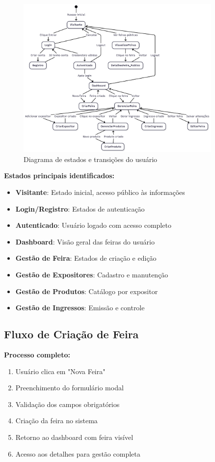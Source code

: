 \documentclass[12pt,a4paper]{article}
\begin{document}
\begin{figure}[H]
\centering
\includegraphics[width=0.9\textwidth]{diagrams/diagrama_estados_usuario.png}
\caption{Diagrama de estados e transições do usuário}
\label{fig:diagrama_estados}
\end{figure}

\textbf{Estados principais identificados:}
\begin{itemize}
    \item \textbf{Visitante}: Estado inicial, acesso público às informações
    \item \textbf{Login/Registro}: Estados de autenticação
    \item \textbf{Autenticado}: Usuário logado com acesso completo
    \item \textbf{Dashboard}: Visão geral das feiras do usuário
    \item \textbf{Gestão de Feira}: Estados de criação e edição
    \item \textbf{Gestão de Expositores}: Cadastro e manutenção
    \item \textbf{Gestão de Produtos}: Catálogo por expositor
    \item \textbf{Gestão de Ingressos}: Emissão e controle
\end{itemize}

\subsection{Fluxo de Criação de Feira}

\textbf{Processo completo:}
\begin{enumerate}
    \item Usuário clica em "Nova Feira"
    \item Preenchimento do formulário modal
    \item Validação dos campos obrigatórios
    \item Criação da feira no sistema
    \item Retorno ao dashboard com feira visível
    \item Acesso aos detalhes para gestão completa
\end{enumerate}
\end{document}
